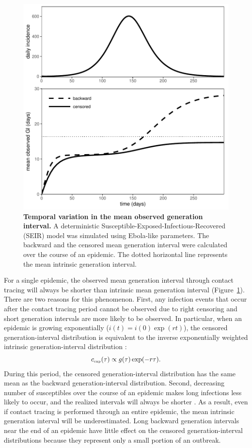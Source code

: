 \documentclass[12pt]{article}
\newcommand{\tsub}[2]{#1_{{\textrm{\tiny #2}}}}
\begin{document}
\begin{figure}[!pbth]
\includegraphics[width=\textwidth]{../fig/temporal_effect.pdf}
\caption{\textbf{Temporal variation in the mean observed generation interval.}
A deterministic Susceptible-Exposed-Infectious-Recovered (SEIR) model was simulated using Ebola-like parameters. The backward and the censored mean generation interval were calculated over the course of an epidemic.
The dotted horizontal line represents the mean intrinsic generation interval.
}
\label{fig:censor}
\end{figure}

For a single epidemic, the observed mean generation interval through contact tracing will always be shorter than intrinsic mean generation interval (Figure~\ref{fig:censor}).
There are two reasons for this phenomenon.
First, any infection events that occur after the contact tracing period cannot be observed due to right censoring and short generation intervals are more likely to be observed.
In particular, when an epidemic is growing exponentially ($i(t) = i(0) \exp(rt)$), 
the censored generation-interval distribution is equivalent to the inverse exponentially weighted intrinsic generation-interval distribution \citep{britton2019estimation}:
\begin{equation}
\tsub{c}{exp}(\tau) \propto g(\tau) \exp(-r\tau).
\label{eq:exp}
\end{equation}
During this period, the censored generation-interval distribution has the same mean as the backward generation-interval distribution.
Second, decreasing number of susceptibles over the course of an epidemic makes long infections less likely to occur, and the realized intervals will always be shorter \citep{champredon2015intrinsic}.
As a result, even if contact tracing is performed through an entire epidemic, the mean intrinsic generation interval will be underestimated.
Long backward generation intervals near the end of an epidemic have little effect on the censored generation-interval distributions because they represent only a small portion of an outbreak.
\end{document}
